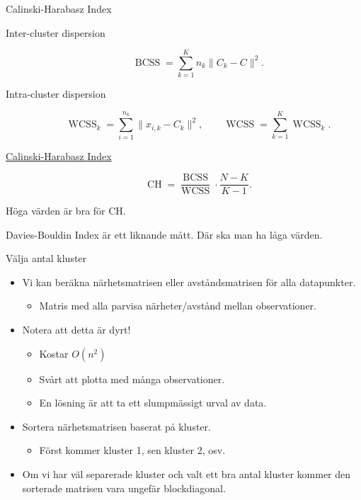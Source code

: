 \documentclass[10pt,english]{beamer}
\begin{document}
\begin{frame}{Calinski-Harabasz Index}
    \begin{description}
        \item[Inter-cluster dispersion]
        \begin{equation*}
            \operatorname{BCSS} = \sum_{k=1}^{K} n_k \| C_k - C \|^2.
        \end{equation*}
        \item[Intra-cluster dispersion]
        \begin{equation*}
            \operatorname{WCSS}_k = \sum_{i=1}^{n_k} \| x_{i,k} - C_k \|^2, \qquad \operatorname{WCSS} = \sum_{k=1}^{K} \operatorname{WCSS}_k.
        \end{equation*}
        \item [\href{https://en.wikipedia.org/wiki/Calinski\%E2\%80\%93Harabasz_index}{Calinski-Harabasz Index}]
        \begin{equation*}
            \operatorname{CH} = \frac{\operatorname{BCSS}}{\operatorname{WCSS}} \cdot \frac{N - K}{K-1}.
        \end{equation*}
    \end{description}
    Höga värden är bra för CH.

    Davies-Bouldin Index är ett liknande mått. Där ska man ha låga värden.
\end{frame}

\begin{frame}{Välja antal kluster}

    \begin{itemize}
        \item Vi kan beräkna närhetsmatrisen eller avståndsmatrisen för alla datapunkter.
        \begin{itemize}
            \item Matris med alla parvisa närheter/avstånd mellan observationer.
        \end{itemize}
        \item Notera att detta är dyrt!
        \begin{itemize}
            \item Kostar $O(n^2)$
            \item Svårt att plotta med många observationer.
            \item En lösning är att ta ett slumpmässigt urval av data.
        \end{itemize}
        \item Sortera närhetsmatrisen baserat på kluster.
        \begin{itemize}
            \item Först kommer kluster 1, sen kluster 2, osv.
        \end{itemize}
        \item Om vi har väl separerade kluster och valt ett bra antal kluster kommer den sorterade matrisen vara ungefär blockdiagonal.
    \end{itemize}
    
\end{frame}
\end{document}
